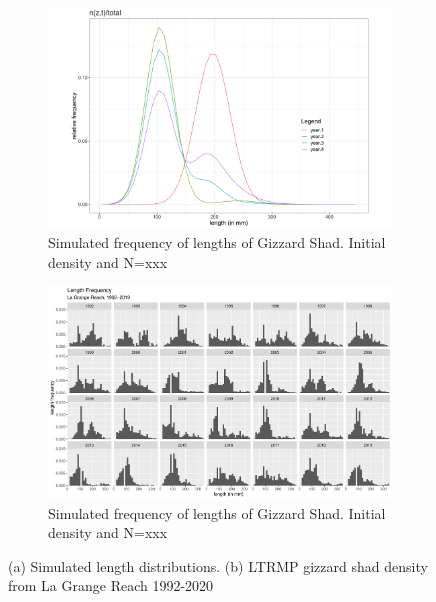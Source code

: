 \documentclass[preprint,review,12pt,authoryear]{elsarticle}
\begin{document}
\begin{figure}
\centering
\begin{subfigure}[b]{.43\textwidth}
  \includegraphics[width=\textwidth]{figures/sim.png}
\caption{Simulated frequency of lengths of Gizzard Shad.  Initial density  and N=xxx}
\label{fig:length_dist}
\end{subfigure}
\begin{subfigure}[b]{.43\textwidth}
\includegraphics[width=\textwidth]{figures/LTRMgraph.pdf}
\caption{Simulated frequency of lengths of Gizzard Shad.  Initial density  and N=xxx}
\label{fig:length_dist}
\end{subfigure}
\caption{(a) Simulated length distributions. (b) LTRMP gizzard shad density from La Grange Reach 1992-2020}
\end{figure}    
\end{document}
